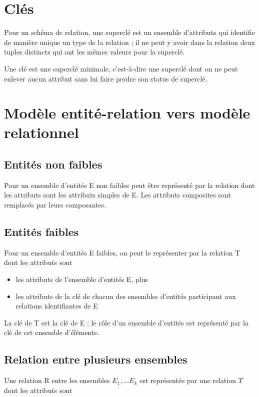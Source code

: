 	
	\section{Clés}
	
	Pour un schéma de relation, une superclé est un ensemble d'attributs qui identifie de manière unique un type de la relation ; il ne peut y avoir dans la relation deux tuples distincts qui ont les mêmes valeurs pour la superclé.
	
	Une clé est une superclé minimale, c'est-à-dire une superclé dont on ne peut enlever aucun attribut sans lui faire perdre son status de superclé.
	
	 \section{Modèle entité-relation vers modèle relationnel}
	 
	 	\subsection{Entités non faibles}
	 Pour un ensemble d'entités E non faibles peut être représenté par la relation dont les attributs sont les attributs simples de E. Les attributs composites sont remplacés par leurs composantes.
	 
	 	\subsection{Entités faibles}
	 Pour un ensemble d'entités E faibles, on peut le représenter par la relation T dont les attributs sont
	 
	 \begin{itemize}
	 	\item les attributs de l'ensemble d'entités E, plus
	 	\item les attributs de la clé de chacun des ensembles d'entités participant aux relations identifiantes de E
	 \end{itemize}
	 
	 La clé de T est la clé  de E ; le rôle d'un ensemble d'entités est représenté par la clé de cet ensemble d'éléments.
	 
	 	\subsection{Relation entre plusieurs ensembles}
	 Une relation R entre les ensembles $E_1 , \dots E_k$ est représentée par une relation $T$ dont les attributs sont
	 
